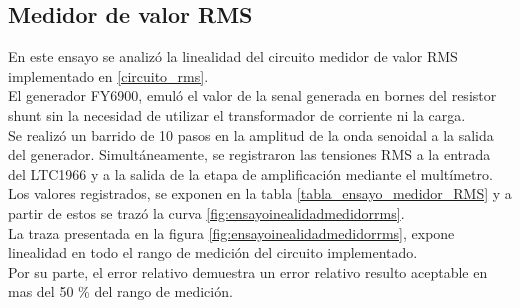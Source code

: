 \subsection{Medidor de valor RMS}\label{ensayo_medidor_rms}
En este ensayo se analiz\'{o} la linealidad del circuito medidor de valor RMS implementado en \ref{circuito_rms}.\\
El generador FY6900, emul\'{o} el valor de la senal generada en bornes del resistor shunt sin la necesidad de utilizar el transformador de corriente ni la carga.\\
Se realiz\'{o} un barrido de 10 pasos en la amplitud de la onda senoidal a la salida del generador. Simultáneamente, se registraron las tensiones RMS a la entrada del LTC1966 y a la salida de la etapa de amplificaci\'{o}n mediante el mult\'{i}metro. Los valores registrados, se exponen en la tabla \ref{tabla_ensayo_medidor_RMS} y a partir de estos se traz\'{o} la curva \ref{fig:ensayoinealidadmedidorrms}.\\
La traza presentada en la figura \ref{fig:ensayoinealidadmedidorrms}, expone linealidad en todo el rango de medici\'{o}n del circuito implementado.\\
Por su parte, el error relativo demuestra un error relativo resulto aceptable en mas del 50 \% del rango de medici\'{o}n.
